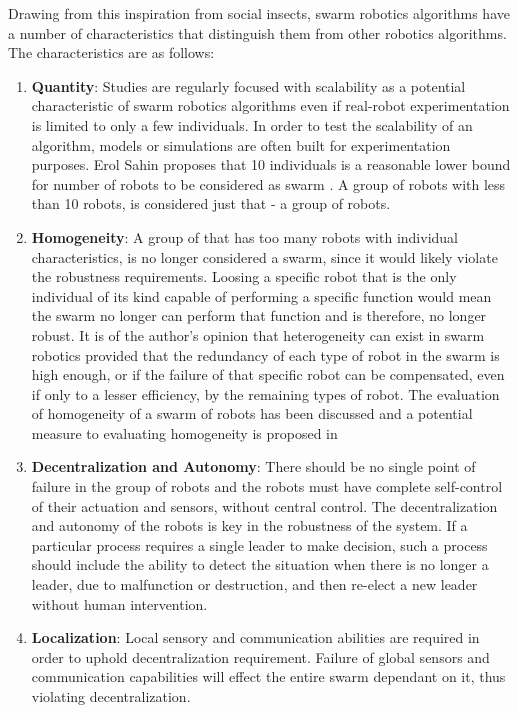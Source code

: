 Drawing from this inspiration from social insects, swarm robotics algorithms have a number of characteristics that distinguish them from other robotics algorithms. The characteristics are as follows:

\begin{enumerate}

\item \textbf{Quantity}: Studies are regularly focused with scalability as a potential characteristic of swarm robotics algorithms even if real-robot experimentation is limited to only a few individuals. In order to test the scalability of an algorithm, models or simulations are often built for experimentation purposes. Erol Sahin proposes that 10 individuals is a reasonable lower bound for number of robots to be considered as swarm \cite{csahin2005swarm}. A group of robots with less than 10 robots, is considered just that - a group of robots. 

\item \textbf{Homogeneity}: A group of that has too many robots with individual characteristics, is no longer considered a swarm, since it would likely violate the robustness requirements. Loosing a specific robot that is the only individual of its kind capable of performing a specific function would mean the swarm no longer can perform that function and is therefore, no longer robust. It is of the author's opinion that heterogeneity can exist in swarm robotics provided that the redundancy of each type of robot in the swarm is high enough, or if the failure of that specific robot can be compensated, even if only to a lesser efficiency, by the remaining types of robot. The evaluation of homogeneity of a swarm of robots has been discussed and a potential measure to evaluating homogeneity is proposed in \cite{balch2000hierarchic}

\item \textbf{Decentralization and Autonomy}: There should be no single point of failure in the group of robots and the robots must have complete self-control of their actuation and sensors, without central control. The decentralization and autonomy of the robots is key in the robustness of the system. If a particular process requires a single leader to make decision, such a process should include the ability to detect the situation when there is no longer a leader, due to malfunction or destruction, and then re-elect a new leader without human intervention.

\item \textbf{Localization}: Local sensory and communication abilities are required in order to uphold decentralization requirement. Failure of global sensors and communication capabilities will effect the entire swarm dependant on it, thus violating decentralization. 


\end{enumerate}
